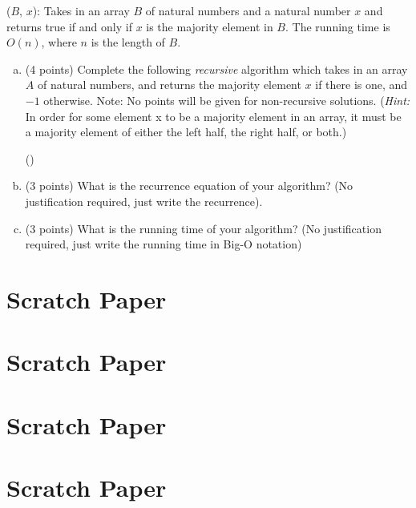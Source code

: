 \documentclass[12pt]{amsart}
\begin{document}
\smallskip
\isMajElement($B$, $x$): Takes in an array $B$ of natural numbers and a natural number $x$ and returns true if and only if $x$ is the majority element in $B$. 
The running time is $O(n)$, where $n$ is the length of $B$.

\begin{enumerate}[(a)]
\item(4 points) Complete the following \textit{recursive} algorithm which takes in an array $A$ of natural numbers, and returns the majority element $x$ if there is one, and $-1$ otherwise. Note: No points will be given for non-recursive solutions. ({\em Hint:} In order for some element x to be a majority element in an array, it must be a majority element of either the left half, the right half, or both.) 



\smallskip
\begin{algorithm}[H]
\Fn(){}{
\SetAlgoLined
\SetNoFillComment
\DontPrintSemicolon
	\vspace{5.5in}
}
\end{algorithm}


\newpage

\item(3 points) What is the recurrence equation of your algorithm? (No justification required, just write the recurrence).

\vfill

\item(3 points) What is the running time of your algorithm? (No justification required, just write the running time in Big-O notation)

\vfill

\end{enumerate}

\newpage
\section*{Scratch Paper}

\pagebreak
\section*{Scratch Paper}

\pagebreak
\section*{Scratch Paper}


\pagebreak
\section*{Scratch Paper}


\end{document}

